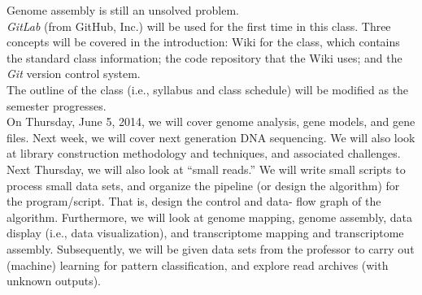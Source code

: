 Genome assembly is still an unsolved problem. \\

{\it GitLab} (from GitHub, Inc.) will be used for the first time in this class. Three concepts will be covered in the introduction: Wiki for the class, which contains the standard class information; the code repository that the Wiki uses; and the {\it Git} version control system. \\

The outline of the class (i.e., syllabus and class schedule) will be modified as the semester progresses. \\

On Thursday, June 5, 2014, we will cover genome analysis, gene models, and gene files. Next week, we will cover next generation DNA sequencing. We will also look at library construction methodology and techniques, and associated challenges. Next Thursday, we will also look at ``small reads.'' We will write small scripts to process small data sets, and organize the pipeline (or design the algorithm) for the program/script. That is, design the control and data- flow graph of the algorithm. Furthermore, we will look at genome mapping, genome assembly, data display (i.e., data visualization), and transcriptome mapping and transcriptome assembly. Subsequently, we will be given data sets from the professor to carry out (machine) learning for pattern classification, and explore read archives (with unknown outputs). \\




